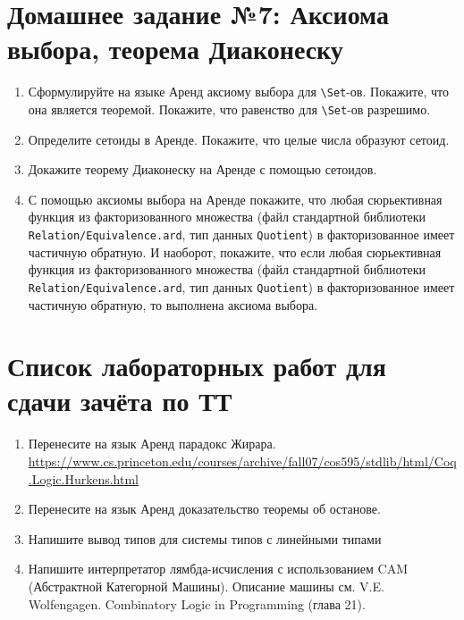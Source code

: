 \documentclass[10pt,a4paper,oneside]{article}
\begin{document}
\section*{Домашнее задание №7: Аксиома выбора, теорема Диаконеску}
\begin{enumerate}
\item Сформулируйте на языке Аренд аксиому выбора для \verb!\Set!-ов. Покажите, что она является теоремой.
Покажите, что равенство для \verb!\Set!-ов разрешимо.
\item Определите сетоиды в Аренде. Покажите, что целые числа образуют сетоид.
\item Докажите теорему Диаконеску на Аренде с помощью сетоидов.
\item С помощью аксиомы выбора на Аренде покажите, что любая сюрьективная функция из факторизованного множества (файл стандартной
библиотеки \verb!Relation/Equivalence.ard!, тип данных \verb!Quotient!) в факторизованное имеет частичную обратную.
И наоборот, покажите, что если любая сюрьективная функция из факторизованного множества (файл стандартной
библиотеки\\ \verb!Relation/Equivalence.ard!, тип данных \verb!Quotient!) в факторизованное имеет частичную обратную, то выполнена аксиома выбора.
\end{enumerate}

\section*{Список лабораторных работ для сдачи зачёта по ТТ}
\begin{enumerate}

\item Перенесите на язык Аренд парадокс Жирара.
\url{https://www.cs.princeton.edu/courses/archive/fall07/cos595/stdlib/html/Coq.Logic.Hurkens.html}

\item Перенесите на язык Аренд доказательство теоремы об останове.

\item Напишите вывод типов для системы типов с линейными типами

\item Напишите интерпретатор лямбда-исчисления с использованием CAM (Абстрактной Категорной Машины).
Описание машины см. V.E. Wolfengagen. Combinatory Logic in Programming (глава 21).

\end{enumerate}
\end{document}

